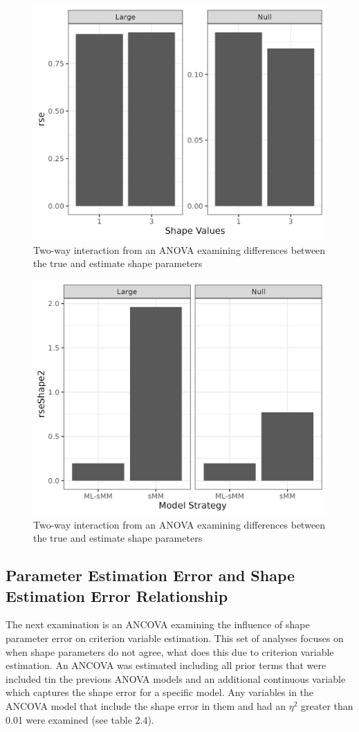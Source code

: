 \documentclass[12pt]{./styles/outhesis}
\begin{document}
\begin{figure}
\includegraphics[width=12cm]{figures/anova2TwoWay2.png}
\caption{Two-way interaction from an ANOVA examining differences between
the true and estimate shape parameters}
\end{figure}

\begin{figure}
\includegraphics[width=12cm]{figures/anova2TwoWay1.png}
\caption{Two-way interaction from an ANOVA examining differences between
the true and estimate shape parameters}
\end{figure}


\subsection{Parameter Estimation Error and Shape Estimation Error Relationship}
The next examination is an ANCOVA examining the influence of shape
parameter error on criterion variable estimation. This set of analyses
focuses on when shape parameters do not agree, what does this due to
criterion variable estimation. An ANCOVA was estimated including all
prior terms that were included tin the previous ANOVA models and an
additional continuous variable which captures the shape error for a
specific model. Any variables in the ANCOVA model that include the shape
error in them and had an \(\eta^2\) greater than 0.01 were examined (see
table 2.4).
\end{document}
